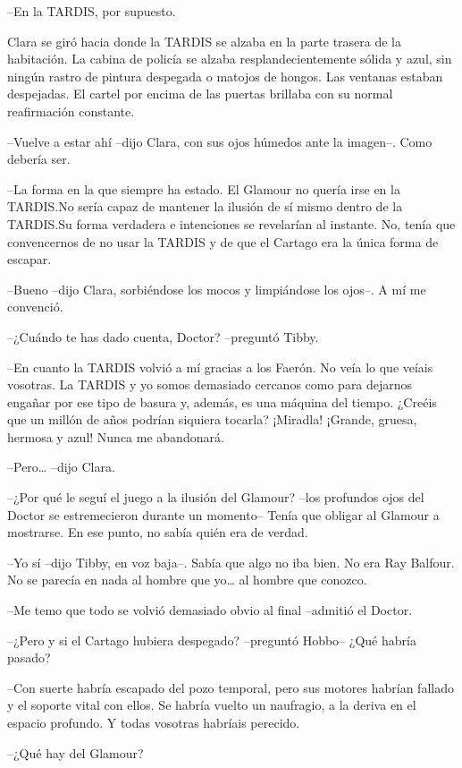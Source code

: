 {--En la TARDIS, por supuesto.}

{Clara se giró hacia donde la TARDIS se alzaba en la parte trasera de la
 habitación. La cabina de policía se alzaba resplandecientemente sólida y
 azul, sin ningún rastro de pintura despegada o matojos de hongos. Las
 ventanas estaban despejadas. El cartel por encima de las puertas
brillaba con su normal reafirmación constante.}

{--Vuelve a estar ahí --dijo Clara, con sus ojos húmedos ante la
imagen--. Como debería ser.}

{--La forma en la que siempre ha estado. El Glamour no quería irse en la
 TARDIS.\@ No sería capaz de mantener la ilusión de sí mismo dentro de la
 TARDIS.\@ Su forma verdadera e intenciones se revelarían al instante. No,
 tenía que convencernos de no usar la TARDIS y de que el Cartago era la
única forma de escapar.}

{--Bueno --dijo Clara, sorbiéndose los mocos y limpiándose los ojos--. A
mí me convenció.}

{--¿Cuándo te has dado cuenta, Doctor? --preguntó Tibby.}

{--En cuanto la TARDIS volvió a mí gracias a los Faerón. No veía lo que
 veíais vosotras. La TARDIS y yo somos demasiado cercanos como para
 dejarnos engañar por ese tipo de basura y, además, es una máquina del
 tiempo. ¿Creéis que un millón de años podrían siquiera tocarla?
¡Miradla! ¡Grande, gruesa, hermosa y azul! Nunca me abandonará.}

{--Pero\ldots{} --dijo Clara.}

{--¿Por qué le seguí el juego a la ilusión del Glamour? --los profundos
 ojos del Doctor se estremecieron durante un momento-- Tenía que obligar
al Glamour a mostrarse. En ese punto, no sabía quién era de verdad.}

{--Yo sí --dijo Tibby, en voz baja--. Sabía que algo no iba bien. No era
 Ray Balfour. No se parecía en nada al hombre que yo\ldots{} al hombre
que conozco.}

{--Me temo que todo se volvió demasiado obvio al final --admitió el
Doctor.}

{--¿Pero y si el Cartago hubiera despegado? --preguntó Hobbo-- ¿Qué
habría pasado?}

{--Con suerte habría escapado del pozo temporal, pero sus motores habrían
 fallado y el soporte vital con ellos. Se habría vuelto un naufragio, a
la deriva en el espacio profundo. Y todas vosotras habríais perecido.}

{--¿Qué hay del Glamour?}

